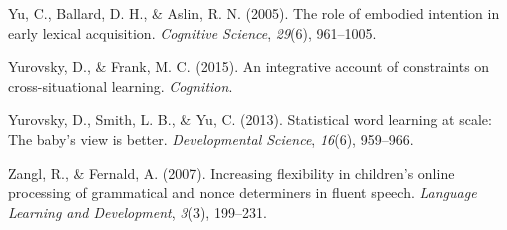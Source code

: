 \documentclass[oneside]{report}
\begin{document}
\hypertarget{ref-yu2005role}{}
Yu, C., Ballard, D. H., \& Aslin, R. N. (2005). The role of embodied
intention in early lexical acquisition. \emph{Cognitive Science},
\emph{29}(6), 961--1005.

\hypertarget{ref-yurovsky2014algorithmic}{}
Yurovsky, D., \& Frank, M. C. (2015). An integrative account of
constraints on cross-situational learning. \emph{Cognition}.

\hypertarget{ref-yurovsky2013statistical}{}
Yurovsky, D., Smith, L. B., \& Yu, C. (2013). Statistical word learning
at scale: The baby's view is better. \emph{Developmental Science},
\emph{16}(6), 959--966.

\hypertarget{ref-zangl2007increasing}{}
Zangl, R., \& Fernald, A. (2007). Increasing flexibility in children's
online processing of grammatical and nonce determiners in fluent speech.
\emph{Language Learning and Development}, \emph{3}(3), 199--231.


\end{document}
